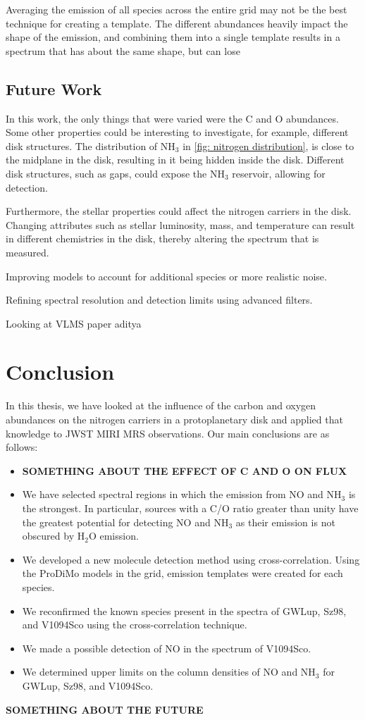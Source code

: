 \documentclass[twoside, single, authoryear, semicolon, 12pt]{lion-msc}
\newcommand{\4}{$_4$}
\newcommand{\3}{$_3$}
\newcommand{\2}{$_2$}
\begin{document}
Averaging the emission of all species across the entire grid may not be the best technique for creating a template. The different abundances heavily impact the shape of the emission, and combining them into a single template results in a spectrum that has about the same shape, but can lose 

\section{Future Work}
In this work, the only things that were varied were the C and O abundances. Some other properties could be interesting to investigate, for example, different disk structures. The distribution of NH\3 in \autoref{fig: nitrogen distribution}, is close to the midplane in the disk, resulting in it being hidden inside the disk. Different disk structures, such as gaps, could expose the NH\3 reservoir, allowing for detection. 

Furthermore, the stellar properties could affect the nitrogen carriers in the disk. Changing attributes such as stellar luminosity, mass, and temperature can result in different chemistries in the disk, thereby altering the spectrum that is measured. 

Improving models to account for additional species or more realistic noise.

Refining spectral resolution and detection limits using advanced filters.

Looking at VLMS paper aditya \citep{Arabhavi_2024}

\chapter{Conclusion}\label{Ch: Conclusion}
In this thesis, we have looked at the influence of the carbon and oxygen abundances on the nitrogen carriers in a protoplanetary disk and applied that knowledge to JWST MIRI MRS observations. Our main conclusions are as follows:
\begin{itemize}
    \item \textbf{SOMETHING ABOUT THE EFFECT OF C AND O ON FLUX}
    \item We have selected spectral regions in which the emission from NO and NH\3 is the strongest. In particular, sources with a C/O ratio greater than unity have the greatest potential for detecting NO and NH\3 as their emission is not obscured by H\2O emission.
    \item We developed a new molecule detection method using cross-correlation. Using the ProDiMo models in the grid, emission templates were created for each species. 
    \item We reconfirmed the known species present in the spectra of GWLup, Sz98, and V1094Sco using the cross-correlation technique.
    \item We made a possible detection of NO in the spectrum of V1094Sco.
    \item We determined upper limits on the column densities of NO and NH\3 for GWLup, Sz98, and V1094Sco.
\end{itemize}
\textbf{SOMETHING ABOUT THE FUTURE}


\appendix
\end{document}
